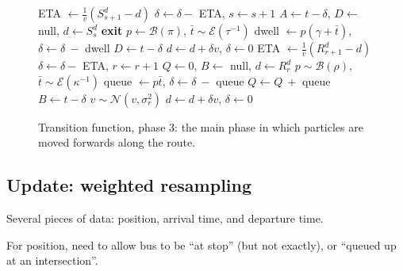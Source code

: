 \documentclass[draftcls,a4paper,onecolumn]{IEEEtran}\usepackage[]{graphicx}\usepackage[]{color}
\begin{document}
\begin{figure}[bt]
  \begin{algorithmic}
        \State ETA  $\gets \frac{1}{v} (S^d_{s+1} - d)$
          \State $\delta\gets \delta - $ ETA, $s \gets s + 1$
          \State $A \gets t - \delta$, $D\gets $ null, $d\gets S^d_s$
            \State\textbf{exit}
          \EndIf
          \State $p\gets \mathcal{B}(\pi)$, $\bar t \sim \mathcal{E}(\tau^{-1})$
          \State dwell $\gets p(\gamma + \bar t)$, $\delta\gets \delta\ - $ dwell
            \State $D\gets t - \delta$
          \EndIf
        \Else
          \State $d\gets d + \delta v$, $\delta \gets 0$
        \EndIf
      \Else
        \State ETA $\gets \frac{1}{v}(R^d_{r+1} - d)$
          \State $\delta\gets \delta - $ ETA, $r\gets r + 1$
          \State $Q \gets 0$, $B\gets $ null, $d\gets R^d_r$
          \State $p \sim \mathcal{B}(\rho)$, $\bar t \sim \mathcal{E}(\kappa^{-1})$
          \State queue $\gets p\bar t$, $\delta\gets \delta\ - $ queue
          \State $Q\gets Q\ +$ queue
            \State $B\gets t - \delta$
            \State $v \sim \mathcal{N}(v, \sigma_r^2)$
          \EndIf
        \Else
          \State $d\gets d + \delta v$, $\delta \gets 0$
        \EndIf
      \EndIf
    \EndWhile
    \EndPhase
  \end{algorithmic}
  \caption{Transition function, phase 3: the main phase in which particles are moved forwards along the route.}
  \label{alg:transitionPhase3}
\end{figure}



\subsection{Update: weighted resampling}


Several pieces of data: position, arrival time, and departure time.

For position, need to allow bus to be ``at stop'' (but not exactly),
or ``queued up at an intersection''.
\end{document}
